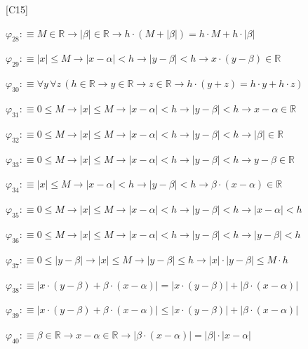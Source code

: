 \begin{fullproof}{[C15]}
\begin{abbrevlist}
\item $\varphi_{28} :\equiv M \in \mathbb{R} \to \lvert \beta \rvert \in \mathbb{R} \to h \cdot (M + \lvert \beta \rvert) = h \cdot M + h \cdot \lvert \beta \rvert$
\item $\varphi_{29} :\equiv \lvert x \rvert \leq M \to \lvert x - \alpha \rvert < h \to \lvert y - \beta \rvert < h \to x \cdot (y - \beta) \in \mathbb{R}$
\item $\varphi_{30} :\equiv \forall y\,\forall z\,(h \in \mathbb{R} \to y \in \mathbb{R} \to z \in \mathbb{R} \to h \cdot (y + z) = h \cdot y + h \cdot z)$
\item $\varphi_{31} :\equiv 0 \leq M \to \lvert x \rvert \leq M \to \lvert x - \alpha \rvert < h \to \lvert y - \beta \rvert < h \to x - \alpha \in \mathbb{R}$
\item $\varphi_{32} :\equiv 0 \leq M \to \lvert x \rvert \leq M \to \lvert x - \alpha \rvert < h \to \lvert y - \beta \rvert < h \to \lvert \beta \rvert \in \mathbb{R}$
\item $\varphi_{33} :\equiv 0 \leq M \to \lvert x \rvert \leq M \to \lvert x - \alpha \rvert < h \to \lvert y - \beta \rvert < h \to y - \beta \in \mathbb{R}$
\item $\varphi_{34} :\equiv \lvert x \rvert \leq M \to \lvert x - \alpha \rvert < h \to \lvert y - \beta \rvert < h \to \beta \cdot (x - \alpha) \in \mathbb{R}$
\item $\varphi_{35} :\equiv 0 \leq M \to \lvert x \rvert \leq M \to \lvert x - \alpha \rvert < h \to \lvert y - \beta \rvert < h \to \lvert x - \alpha \rvert < h$
\item $\varphi_{36} :\equiv 0 \leq M \to \lvert x \rvert \leq M \to \lvert x - \alpha \rvert < h \to \lvert y - \beta \rvert < h \to \lvert y - \beta \rvert < h$
\item $\varphi_{37} :\equiv 0 \leq \lvert y - \beta \rvert \to \lvert x \rvert \leq M \to \lvert y - \beta \rvert \leq h \to \lvert x \rvert \cdot \lvert y - \beta \rvert \leq M \cdot h$
\item $\varphi_{38} :\equiv \lvert x \cdot (y - \beta) + \beta \cdot (x - \alpha) \rvert = \lvert x \cdot (y - \beta) \rvert + \lvert \beta \cdot (x - \alpha) \rvert$
\item $\varphi_{39} :\equiv \lvert x \cdot (y - \beta) + \beta \cdot (x - \alpha) \rvert \leq \lvert x \cdot (y - \beta) \rvert + \lvert \beta \cdot (x - \alpha) \rvert$
\item $\varphi_{40} :\equiv \beta \in \mathbb{R} \to x - \alpha \in \mathbb{R} \to \lvert \beta \cdot (x - \alpha) \rvert = \lvert \beta \rvert \cdot \lvert x - \alpha \rvert$

\end{abbrevlist}
\end{fullproof}

